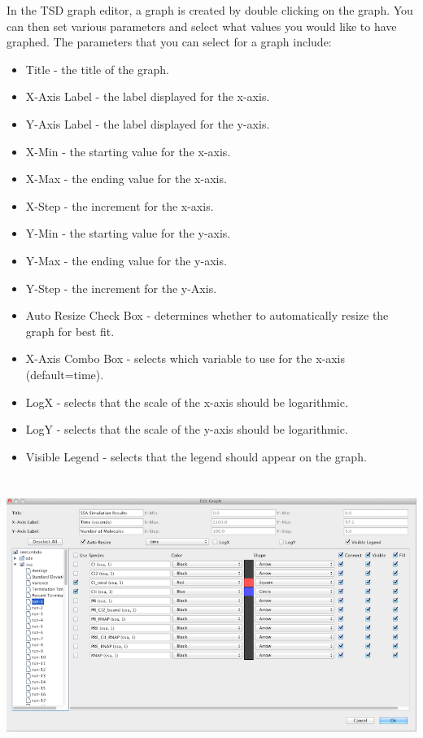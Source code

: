 \documentclass[titlepage,11pt]{article}
\begin{document}
In the TSD graph editor, a graph is created by double clicking on the graph. You can then set various parameters and select what values you would like to have graphed. The parameters that you can select for a graph include: 
\begin{itemize}
\item Title - the title of the graph.
\item X-Axis Label - the label displayed for the x-axis. 
\item Y-Axis Label - the label displayed for the y-axis. 
\item X-Min - the starting value for the x-axis. 
\item X-Max - the ending value for the x-axis. 
\item X-Step - the increment for the x-axis. 
\item Y-Min - the starting value for the y-axis. 
\item Y-Max - the ending value for the y-axis. 
\item Y-Step - the increment for the y-Axis. 
\item Auto Resize Check Box - determines whether to automatically resize the graph for best fit. 
\item X-Axis Combo Box - selects which variable to use for the x-axis (default=time).
\item LogX - selects that the scale of the x-axis should be logarithmic.
\item LogY - selects that the scale of the y-axis should be logarithmic.
\item Visible Legend - selects that the legend should appear on the graph.
\end{itemize}

\begin{center}
\includegraphics[height=90mm]{screenshots/ssaResults}
\end{center}
\end{document}
